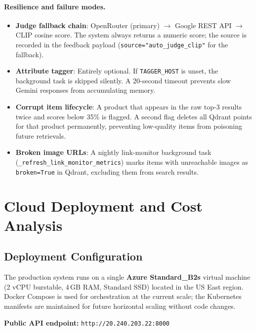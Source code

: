 \documentclass[12pt]{article}
\begin{document}
\paragraph{Resilience and failure modes.}
\begin{itemize}[leftmargin=*, itemsep=2pt]
  \item \textbf{Judge fallback chain}: OpenRouter (primary) $\to$ Google REST API $\to$ CLIP cosine score. The system always returns a numeric score; the source is recorded in the feedback payload (\texttt{source="auto\_judge\_clip"} for the fallback).
  \item \textbf{Attribute tagger}: Entirely optional. If \texttt{TAGGER\_HOST} is unset, the background task is skipped silently. A 20-second timeout prevents slow Gemini responses from accumulating memory.
  \item \textbf{Corrupt item lifecycle}: A product that appears in the raw top-3 results twice and scores below 35\% is flagged. A second flag deletes all Qdrant points for that product permanently, preventing low-quality items from poisoning future retrievals.
  \item \textbf{Broken image URLs}: A nightly link-monitor background task (\texttt{\_refresh\_link\_monitor\_metrics}) marks items with unreachable images as \texttt{broken=True} in Qdrant, excluding them from search results.
\end{itemize}

\section{Cloud Deployment and Cost Analysis}

\subsection{Deployment Configuration}

The production system runs on a single \textbf{Azure Standard\_B2s} virtual machine (2 vCPU burstable, 4\,GB RAM, Standard SSD) located in the US East region. Docker Compose is used for orchestration at the current scale; the Kubernetes manifests are maintained for future horizontal scaling without code changes.

\begin{center}
\textbf{Public API endpoint:} \texttt{http://20.240.203.22:8000}
\end{center}
\end{document}
